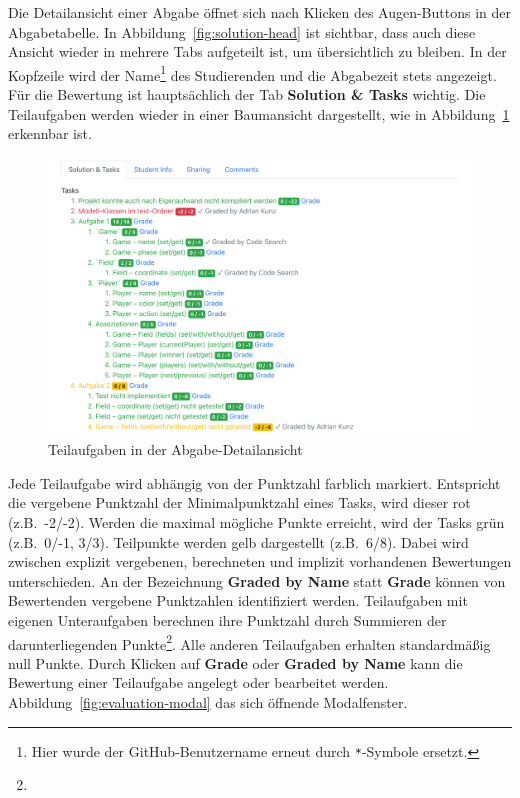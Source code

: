 Die Detailansicht einer Abgabe öffnet sich nach Klicken des Augen-Buttons in der Abgabetabelle.
In Abbildung~\ref{fig:solution-head} ist sichtbar, dass auch diese Ansicht wieder in mehrere Tabs aufgeteilt ist, um übersichtlich zu bleiben.
In der Kopfzeile wird der Name\footnote{Hier wurde der GitHub-Benutzername erneut durch \texttt{*}-Symbole ersetzt.} des Studierenden und die Abgabezeit stets angezeigt.
Für die Bewertung ist hauptsächlich der Tab \textbf{Solution \& Tasks} wichtig.
Die Teilaufgaben werden wieder in einer Baumansicht dargestellt, wie in Abbildung~\ref{fig:solution-tasks} erkennbar ist.

\begin{figure}
    \centering
    \includegraphics[width=\textwidth]{images/solution-tasks}
    \caption{Teilaufgaben in der Abgabe-Detailansicht}
    \label{fig:solution-tasks}
\end{figure}

Jede Teilaufgabe wird abhängig von der Punktzahl farblich markiert.
Entspricht die vergebene Punktzahl der Minimalpunktzahl eines Tasks, wird dieser rot (z.B.\ -2/-2).
Werden die maximal mögliche Punkte erreicht, wird der Tasks grün (z.B.\ 0/-1, 3/3).
Teilpunkte werden gelb dargestellt (z.B.\ 6/8).
Dabei wird zwischen explizit vergebenen, berechneten und implizit vorhandenen Bewertungen unterschieden.
An der Bezeichnung \textbf{Graded by Name} statt \textbf{Grade} können von Bewertenden vergebene Punktzahlen identifiziert werden.
Teilaufgaben mit eigenen Unteraufgaben berechnen ihre Punktzahl durch Summieren der darunterliegenden Punkte\footnote{}.
Alle anderen Teilaufgaben erhalten standardmäßig null Punkte.
Durch Klicken auf \textbf{Grade} oder \textbf{Graded by Name} kann die Bewertung einer Teilaufgabe angelegt oder bearbeitet werden.
Abbildung~\ref{fig:evaluation-modal} das sich öffnende Modalfenster.

